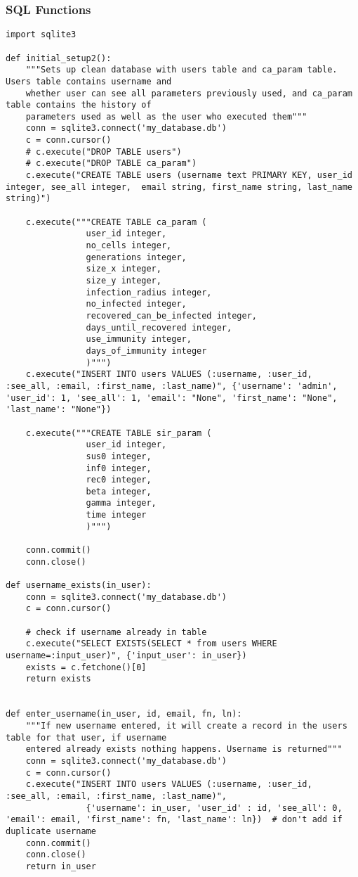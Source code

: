 \documentclass[11pt, a4paper]{article}
\begin{document}
\subsubsection{SQL Functions}
\begin{lstlisting}
import sqlite3

def initial_setup2():
    """Sets up clean database with users table and ca_param table. Users table contains username and
    whether user can see all parameters previously used, and ca_param table contains the history of
    parameters used as well as the user who executed them"""
    conn = sqlite3.connect('my_database.db')
    c = conn.cursor()
    # c.execute("DROP TABLE users")
    # c.execute("DROP TABLE ca_param")
    c.execute("CREATE TABLE users (username text PRIMARY KEY, user_id integer, see_all integer,  email string, first_name string, last_name string)")

    c.execute("""CREATE TABLE ca_param (
                user_id integer,
                no_cells integer,
                generations integer,
                size_x integer,
                size_y integer,
                infection_radius integer,
                no_infected integer,
                recovered_can_be_infected integer,
                days_until_recovered integer,
                use_immunity integer,
                days_of_immunity integer    
                )""")
    c.execute("INSERT INTO users VALUES (:username, :user_id, :see_all, :email, :first_name, :last_name)", {'username': 'admin', 'user_id': 1, 'see_all': 1, 'email': "None", 'first_name': "None", 'last_name': "None"})

    c.execute("""CREATE TABLE sir_param (
                user_id integer,
                sus0 integer,
                inf0 integer,
                rec0 integer,
                beta integer,
                gamma integer,
                time integer
                )""")

    conn.commit()
    conn.close()

def username_exists(in_user):
    conn = sqlite3.connect('my_database.db')
    c = conn.cursor()

    # check if username already in table
    c.execute("SELECT EXISTS(SELECT * from users WHERE username=:input_user)", {'input_user': in_user})
    exists = c.fetchone()[0]
    return exists


def enter_username(in_user, id, email, fn, ln):
    """If new username entered, it will create a record in the users table for that user, if username
    entered already exists nothing happens. Username is returned"""
    conn = sqlite3.connect('my_database.db')
    c = conn.cursor()
    c.execute("INSERT INTO users VALUES (:username, :user_id, :see_all, :email, :first_name, :last_name)",
                {'username': in_user, 'user_id' : id, 'see_all': 0, 'email': email, 'first_name': fn, 'last_name': ln})  # don't add if duplicate username
    conn.commit()
    conn.close()
    return in_user



\end{lstlisting}
\end{document}
